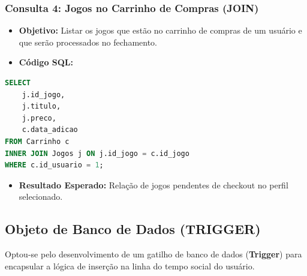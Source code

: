 \documentclass[12pt,a4paper]{article}
\begin{document}
\subsubsection{Consulta 4: Jogos no Carrinho de Compras (JOIN)}
\begin{itemize}
    \item \textbf{Objetivo:} Listar os jogos que estão no carrinho de compras de um usuário e que serão processados no fechamento.
    \item \textbf{Código SQL:}
\end{itemize}
\begin{lstlisting}[language=SQL]
SELECT 
    j.id_jogo, 
    j.titulo, 
    j.preco, 
    c.data_adicao
FROM Carrinho c
INNER JOIN Jogos j ON j.id_jogo = c.id_jogo
WHERE c.id_usuario = 1;
\end{lstlisting}
\begin{itemize}
    \item \textbf{Resultado Esperado:} Relação de jogos pendentes de checkout no perfil selecionado.
\end{itemize}

\subsection{Objeto de Banco de Dados (TRIGGER)}
Optou-se pelo desenvolvimento de um gatilho de banco de dados (\textbf{Trigger}) para encapsular a lógica de inserção na linha do tempo social do usuário.
\end{document}
